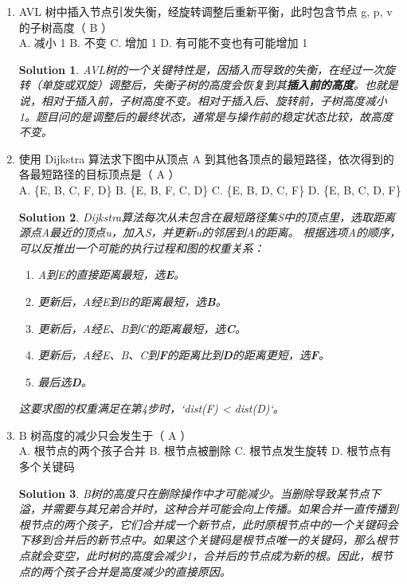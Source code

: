 \documentclass[UTF8]{report}
\newtheorem{solution}{Solution}
\theoremstyle{MyLineTheoremStyle} %
\theoremstyle{MyBlockTheoremStyle} %
\theoremstyle{MySubsubsectionStyle} %
\begin{document}
\begin{enumerate}
    \item AVL 树中插入节点引发失衡，经旋转调整后重新平衡，此时包含节点 g, p, v 的子树高度（ B ）\\
    A. 减小 1 \quad B. 不变 \quad C. 增加 1 \quad D. 有可能不变也有可能增加 1
    \begin{solution}
        AVL树的一个关键特性是，因插入而导致的失衡，在经过一次旋转（单旋或双旋）调整后，失衡子树的高度会恢复到其\textbf{插入前的高度}。也就是说，相对于插入前，子树高度不变。相对于插入后、旋转前，子树高度减小1。题目问的是调整后的最终状态，通常是与操作前的稳定状态比较，故高度不变。
    \end{solution}

    \item 使用 Dijkstra 算法求下图中从顶点 A 到其他各顶点的最短路径，依次得到的各最短路径的目标顶点是（ A ）\\
    A. \{E, B, C, F, D\} \quad B. \{E, B, F, C, D\} \quad C. \{E, B, D, C, F\} \quad D. \{E, B, C, D, F\}
    \begin{solution}
        Dijkstra算法每次从未包含在最短路径集S中的顶点里，选取距离源点A最近的顶点u，加入S，并更新u的邻居到A的距离。
        根据选项A的顺序，可以反推出一个可能的执行过程和图的权重关系：
        \begin{enumerate}
            \item A到E的直接距离最短，选\textbf{E}。
            \item 更新后，A经E到B的距离最短，选\textbf{B}。
            \item 更新后，A经E、B到C的距离最短，选\textbf{C}。
            \item 更新后，A经E、B、C到\textbf{F}的距离比到\textbf{D}的距离更短，选\textbf{F}。
            \item 最后选\textbf{D}。
        \end{enumerate}
        这要求图的权重满足在第4步时，`dist(F) < dist(D)`。
    \end{solution}

    \item B 树高度的减少只会发生于（ A ）\\
    A. 根节点的两个孩子合并 \quad B. 根节点被删除 \quad C. 根节点发生旋转 \quad D. 根节点有多个关键码
    \begin{solution}
        B树的高度只在删除操作中才可能减少。当删除导致某节点下溢，并需要与其兄弟合并时，这种合并可能会向上传播。如果合并一直传播到根节点的两个孩子，它们合并成一个新节点，此时原根节点中的一个关键码会下移到合并后的新节点中。如果这个关键码是根节点唯一的关键码，那么根节点就会变空，此时树的高度会减少1，合并后的节点成为新的根。因此，根节点的两个孩子合并是高度减少的直接原因。
    \end{solution}


\end{enumerate}
\end{document}
